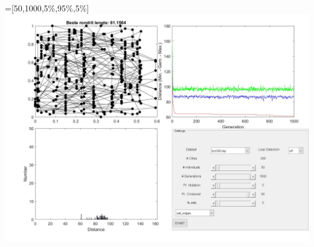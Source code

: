  =[50,1000,5\%,95\%,5\%]\\
\includegraphics[width=\textwidth]{img/specific/xalt_edges/general_5.jpg}\\
\\

